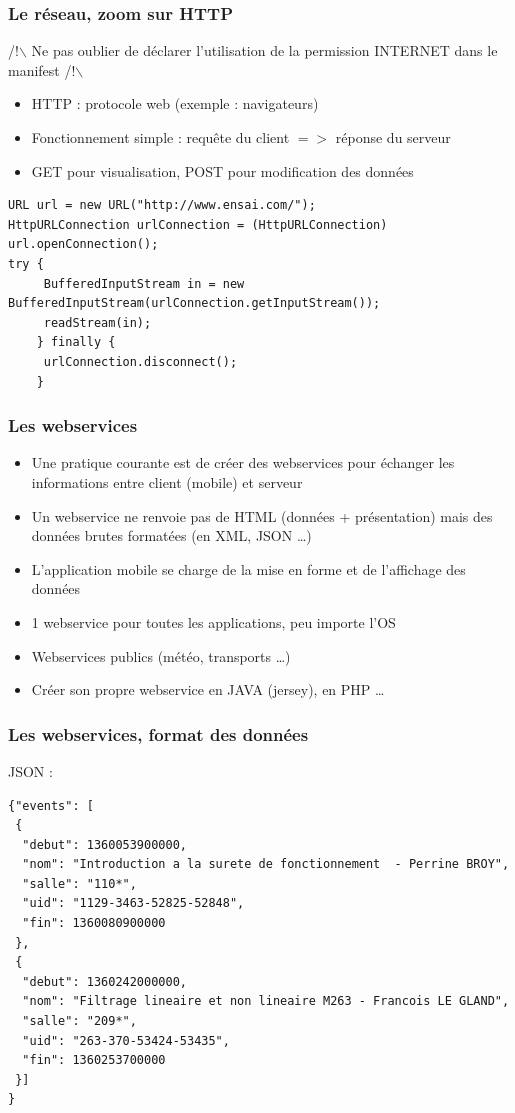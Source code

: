 \documentclass{beamer}
\begin{document}
\begin{frame}[fragile]
\frametitle{Le réseau, zoom sur HTTP}
/!$\backslash$ Ne pas oublier de déclarer l'utilisation de la permission
INTERNET dans le manifest /!$\backslash$
\begin{itemize}
  \item HTTP : protocole web (exemple : navigateurs)
  \item Fonctionnement simple : requête du client $=>$ réponse du serveur
  \item GET pour visualisation, POST pour modification des données
\end{itemize}
\begin{lstlisting}
URL url = new URL("http://www.ensai.com/");
HttpURLConnection urlConnection = (HttpURLConnection) url.openConnection();
try {
     BufferedInputStream in = new BufferedInputStream(urlConnection.getInputStream());
     readStream(in); 
    } finally {
     urlConnection.disconnect();
    }
\end{lstlisting}
\end{frame}
\begin{frame}[fragile]
\frametitle{Les webservices}
\begin{itemize}
  \item Une pratique courante est de créer des webservices pour échanger les informations entre client (mobile) et serveur
  \item Un webservice ne renvoie pas de HTML (données + présentation) mais des
  données brutes formatées (en XML, JSON \ldots)
  \item L'application mobile se charge de la mise en forme et de l'affichage des données
  \item 1 webservice pour toutes les applications, peu importe l'OS
  \item Webservices publics (météo, transports \ldots)
  \item Créer son propre webservice en JAVA (jersey), en PHP \ldots
\end{itemize}    
\end{frame}
\begin{frame}[fragile]
\frametitle{Les webservices, format des données}
JSON :
\begin{lstlisting}
{"events": [
 {
  "debut": 1360053900000,
  "nom": "Introduction a la surete de fonctionnement  - Perrine BROY",
  "salle": "110*",
  "uid": "1129-3463-52825-52848",
  "fin": 1360080900000
 },
 {
  "debut": 1360242000000,
  "nom": "Filtrage lineaire et non lineaire M263 - Francois LE GLAND",
  "salle": "209*",
  "uid": "263-370-53424-53435",
  "fin": 1360253700000
 }]
}
\end{lstlisting}
\end{frame}
\end{document}
